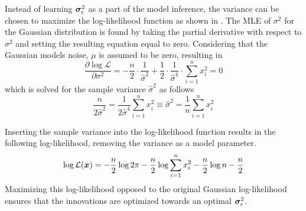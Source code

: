         Instead of learning $\bm{\sigma}_\epsilon^2$ as a part of the model inference, the variance can be chosen to maximize the log-likelihood function as shown in \cite{haerdle2015statistics}. The MLE of $\sigma^2$ for the Gaussian distribution is found by taking the partial derivative with respect to $\sigma^2$ and setting the resulting equation equal to zero. Considering that the Gaussian models noise, $\mu$ is assumed to be zero, resulting in
        \begin{equation}\label{error-sigma-partial}
            \frac{\partial\log\mathcal{L}}{\partial\sigma^2} = -\frac{n}{2} \cdot \frac{1}{\hat{\sigma}^2} + \frac{1}{2} \cdot \frac{1}{\hat{\sigma}^4} \cdot \sum_{i=1}^n x_i^2 = 0
        \end{equation}
        which is solved for the sample variance $\hat{\sigma}^2$ as follows
        \begin{equation}
            \frac{n}{2\hat{\sigma}^2} = \frac{1}{2\hat{\sigma}^4} \sum_{i=1}^n x_i^2 \equiv \hat{\sigma}^2 = \frac{1}{n} \sum_{i=1}^n x_i^2
        \end{equation}
        
        Inserting the sample variance into the log-likelihood function results in the following log-likelihood, removing the variance as a model parameter.
        \begin{equation}
            \log\mathcal{L}(\bm{x})=-\frac{n}{2}\log 2\pi -\frac{n}{2}\log\sum_{i=1}^n x_i^2-\frac{n}{2}\log n-\frac{n}{2}
        \end{equation}
        Maximizing this log-likelihood opposed to the original Gaussian log-likelihood ensures that the innovations are optimized towards an optimal $\bm{\sigma}_\epsilon^2$.
    
